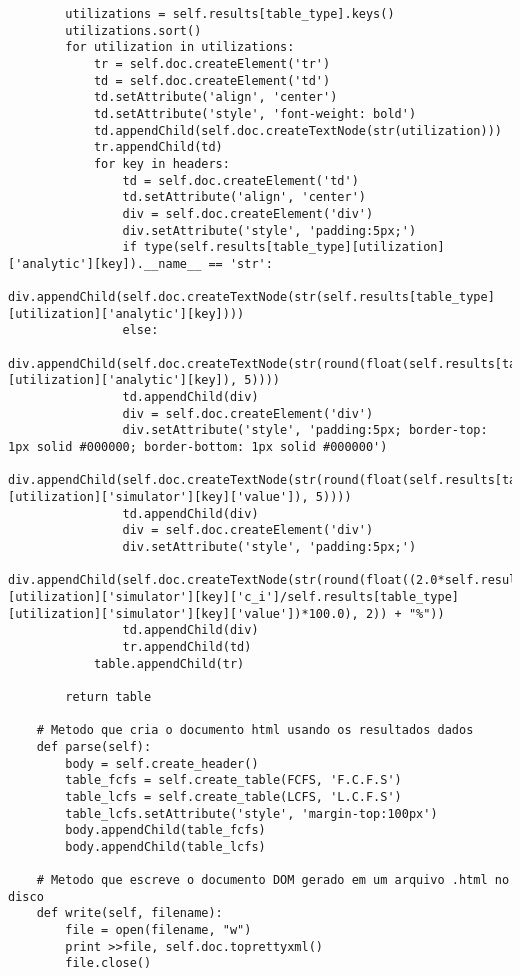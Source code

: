 \begin{lstlisting}
        utilizations = self.results[table_type].keys()
        utilizations.sort()
        for utilization in utilizations:
            tr = self.doc.createElement('tr')
            td = self.doc.createElement('td')
            td.setAttribute('align', 'center')
            td.setAttribute('style', 'font-weight: bold')
            td.appendChild(self.doc.createTextNode(str(utilization)))
            tr.appendChild(td)            
            for key in headers:
                td = self.doc.createElement('td')
                td.setAttribute('align', 'center')            
                div = self.doc.createElement('div')
                div.setAttribute('style', 'padding:5px;')
                if type(self.results[table_type][utilization]['analytic'][key]).__name__ == 'str':
                    div.appendChild(self.doc.createTextNode(str(self.results[table_type][utilization]['analytic'][key])))
                else:
                    div.appendChild(self.doc.createTextNode(str(round(float(self.results[table_type][utilization]['analytic'][key]), 5))))
                td.appendChild(div)
                div = self.doc.createElement('div')
                div.setAttribute('style', 'padding:5px; border-top: 1px solid #000000; border-bottom: 1px solid #000000')
                div.appendChild(self.doc.createTextNode(str(round(float(self.results[table_type][utilization]['simulator'][key]['value']), 5))))                
                td.appendChild(div)
                div = self.doc.createElement('div')
                div.setAttribute('style', 'padding:5px;')
                div.appendChild(self.doc.createTextNode(str(round(float((2.0*self.results[table_type][utilization]['simulator'][key]['c_i']/self.results[table_type][utilization]['simulator'][key]['value'])*100.0), 2)) + "%"))
                td.appendChild(div)
                tr.appendChild(td)
            table.appendChild(tr)
            
        return table
    
    # Metodo que cria o documento html usando os resultados dados
    def parse(self):
        body = self.create_header()
        table_fcfs = self.create_table(FCFS, 'F.C.F.S')
        table_lcfs = self.create_table(LCFS, 'L.C.F.S')
        table_lcfs.setAttribute('style', 'margin-top:100px')
        body.appendChild(table_fcfs)
        body.appendChild(table_lcfs)
    
    # Metodo que escreve o documento DOM gerado em um arquivo .html no disco
    def write(self, filename):
        file = open(filename, "w")
        print >>file, self.doc.toprettyxml()
        file.close()
\end{lstlisting}

